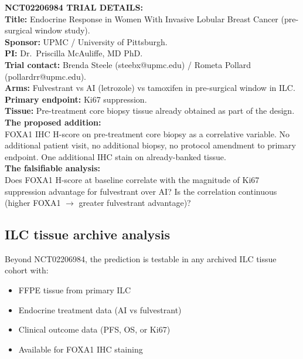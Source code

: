 \documentclass[12pt, a4paper]{article}
\begin{document}
\begin{center}
\colorbox{actionbox}{
\begin{minipage}{0.88\textwidth}
\vspace{0.5em}
\textbf{NCT02206984 TRIAL DETAILS:}\\[0.4em]
\textbf{Title:} Endocrine Response in Women With
Invasive Lobular Breast Cancer (pre-surgical
window study).\\[0.3em]
\textbf{Sponsor:} UPMC / University of Pittsburgh.\\[0.3em]
\textbf{PI:} Dr.\ Priscilla McAuliffe, MD PhD.\\[0.3em]
\textbf{Trial contact:} Brenda Steele
(steebx@upmc.edu) / Rometa Pollard
(pollardrr@upmc.edu).\\[0.3em]
\textbf{Arms:} Fulvestrant vs AI (letrozole) vs
tamoxifen in pre-surgical window in ILC.\\[0.3em]
\textbf{Primary endpoint:} Ki67 suppression.\\[0.3em]
\textbf{Tissue:} Pre-treatment core biopsy tissue
already obtained as part of the design.\\[0.4em]
\textbf{The proposed addition:}\\
FOXA1 IHC H-score on pre-treatment core biopsy
as a correlative variable. No additional patient
visit, no additional biopsy, no protocol amendment
to primary endpoint. One additional IHC stain on
already-banked tissue.\\[0.4em]
\textbf{The falsifiable analysis:}\\
Does FOXA1 H-score at baseline correlate with
the magnitude of Ki67 suppression advantage for
fulvestrant over AI? Is the correlation continuous
(higher FOXA1 $\rightarrow$ greater fulvestrant
advantage)?
\vspace{0.5em}
\end{minipage}}
\end{center}

\subsection{ILC tissue archive analysis}

Beyond NCT02206984, the prediction is testable
in any archived ILC tissue cohort with:
\begin{itemize}
    \item FFPE tissue from primary ILC
    \item Endocrine treatment data (AI vs fulvestrant)
    \item Clinical outcome data (PFS, OS, or Ki67)
    \item Available for FOXA1 IHC staining
\end{itemize}
\end{document}
